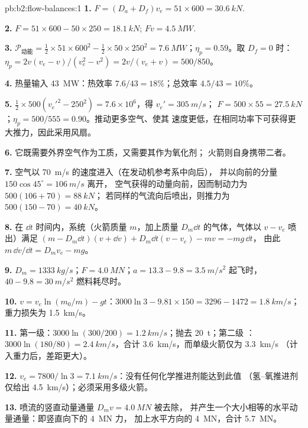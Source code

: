 \begin{solution}{pb:b2:flow-balances:1}
\textbf{1.} $F = (D_a + D_f)v_e = 51 \times 600 = \qty{30.6}{kN}$.

\textbf{2.} $F = 51 \times 600 - 50 \times 250 = \qty{18.1}{kN}$; $Fv = \qty{4.5}{MW}$.

\textbf{3.} $\mathcal P_{\text{动能}} = \tfrac12 \times 51 \times 600^2 - \tfrac12 \times 50 \times 250^2 =
\qty{7.6}{MW}$；$\eta_p = 0.59$。取 $D_f = 0$ 时：$\eta_p = 2v(v_e - v)/(v_e^2 - v^2)
= 2v/(v_e + v) = 500/850$。

\textbf{4.} 热量输入 \qty{43}{MW}：热效率 $7.6/43 = 18\%$；总效率 $4.5/43 = 10\%$。

\textbf{5.} $\tfrac12 \times 500(v_e'^2 - 250^2) = 7.6 \times 10^6$，得 $v_e' = \qty{305}{m/s}$；
$F = 500 \times 55 = \qty{27.5}{kN}$；$\eta_p = 500/555 = 0.90$。推动更多空气、使其
速度更低，在相同功率下可获得更大推力，因此采用风扇。

\textbf{6.} 它既需要外界空气作为工质，又需要其作为氧化剂；
火箭则自身携带二者。

\textbf{7.} 空气以 \qty{70}{m/s} 的速度进入（在发动机参考系中向后），
并以向前的分量 $150\cos45^\circ = \qty{106}{m/s}$ 离开，
空气获得的动量向前，因而制动力为 $500(106 + 70) = \qty{88}{kN}$；
若同样的气流向后喷出，则推力为 $500(150 - 70) =
\qty{40}{kN}$。

\textbf{8.} 在 $\dd t$ 时间内，系统（火箭质量 $m$，加上质量 $D_m\dd t$ 的气体，气体以 $v - v_e$ 喷出）满足
$(m - D_m\dd t)(v + \dd v) + D_m\dd t(v - v_e) - mv = -mg\,\dd t$，
由此 $m\,\dd v/\dd t = D_mv_e - mg$。

\textbf{9.} $D_m = \qty{1333}{kg/s}$；$F = \qty{4.0}{MN}$；$a = 13.3 - 9.8 =
\qty{3.5}{m/s^2}$ 起飞时，$40 - 9.8 = \qty{30}{m/s^2}$ 燃料耗尽时。

\textbf{10.} $v = v_e\ln(m_0/m) - gt$：$3000\ln3 - 9.81 \times 150 = 3296 - 1472 =
\qty{1.8}{km/s}$；重力损失为 \qty{1.5}{km/s}。

\textbf{11.} 第一级：$3000\ln(300/200) = \qty{1.2}{km/s}$；抛去 \qty{20}{t}；第二级
：$3000\ln(180/80) = \qty{2.4}{km/s}$，合计 \qty{3.6}{km/s}，而单级火箭仅为 \qty{3.3}{km/s}
（计入重力后，差距更大）。

\textbf{12.} $v_e = 7800/\ln3 = \qty{7.1}{km/s}$：没有任何化学推进剂能达到此值
（氢–氧推进剂仅给出 \qty{4.5}{km/s}）；必须采用多级火箭。

\textbf{13.} 喷流的竖直动量通量 $D_mv = \qty{4.0}{MN}$ 被去除，
并产生一个大小相等的水平动量通量：即竖直向下的 \qty{4}{MN} 力，
加上水平方向的 \qty{4}{MN}，合计 \qty{5.7}{MN}。


\end{solution}
